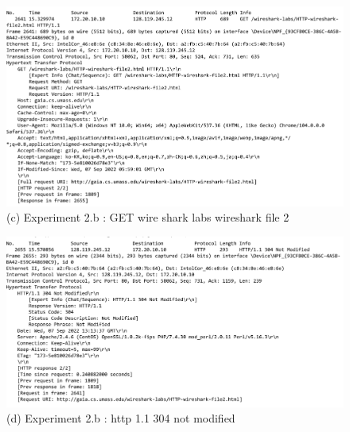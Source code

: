         \vspace{-4mm}
        \begin{figure}[!h]\centering
    		\includegraphics[width=.9\textwidth]{image/week01/2-7.png}
    		\caption*{\small (c) Experiment 2.b : GET wire shark labs wireshark file 2}
        	\end{figure}
        \vspace{-4mm}
        \begin{figure}[!h]\centering
    		\includegraphics[width=.9\textwidth]{image/week01/2-8.png}
    		\caption*{\small (d) Experiment 2.b : http 1.1 304 not modified }
        	\end{figure}
        \vspace{-4mm}

